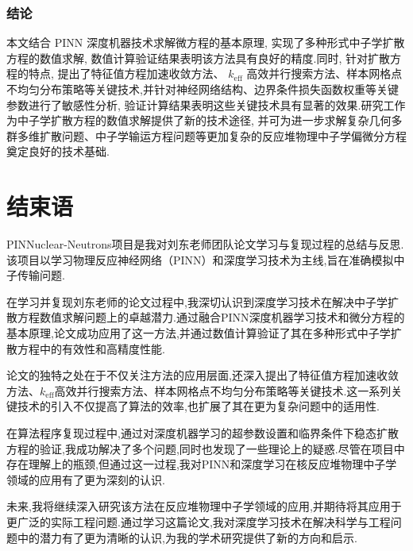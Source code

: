 \documentclass{Sichuan Normal University}
\begin{document}
\subsubsection{结论}
本文结合 PINN 深度机器技术求解微方程的基本原理, 实现了多种形式中子学扩散方程的数值求解, 数值计算验证结果表明该方法具有良好的精度.同时, 针对扩散方程的特点, 提出了特征值方程加速收敛方法、 $k_{\mathrm{eff}}$ 高效并行搜索方法、样本网格点不均匀分布策略等关键技术,并针对神经网络结构、边界条件损失函数权重等关键参数进行了敏感性分析, 验证计算结果表明这些关键技术具有显著的效果.研究工作为中子学扩散方程的数值求解提供了新的技术途径, 并可为进一步求解复杂几何多群多维扩散问题、中子学输运方程问题等更加复杂的反应堆物理中子学偏微分方程奠定良好的技术基础.


\section{结束语}
PINNuclear-Neutrons项目是我对刘东老师团队论文学习与复现过程的总结与反思.该项目以学习物理反应神经网络（PINN）和深度学习技术为主线,旨在准确模拟中子传输问题.

在学习并复现刘东老师的论文过程中,我深切认识到深度学习技术在解决中子学扩散方程数值求解问题上的卓越潜力.通过融合PINN深度机器学习技术和微分方程的基本原理,论文成功应用了这一方法,并通过数值计算验证了其在多种形式中子学扩散方程中的有效性和高精度性能.

论文的独特之处在于不仅关注方法的应用层面,还深入提出了特征值方程加速收敛方法、$k_{\mathrm{eff}}$高效并行搜索方法、样本网格点不均匀分布策略等关键技术.这一系列关键技术的引入不仅提高了算法的效率,也扩展了其在更为复杂问题中的适用性.

在算法程序复现过程中,通过对深度机器学习的超参数设置和临界条件下稳态扩散方程的验证,我成功解决了多个问题,同时也发现了一些理论上的疑惑.尽管在项目中存在理解上的瓶颈,但通过这一过程,我对PINN和深度学习在核反应堆物理中子学领域的应用有了更为深刻的认识.

未来,我将继续深入研究该方法在反应堆物理中子学领域的应用,并期待将其应用于更广泛的实际工程问题.通过学习这篇论文,我对深度学习技术在解决科学与工程问题中的潜力有了更为清晰的认识,为我的学术研究提供了新的方向和启示.


\end{document}
